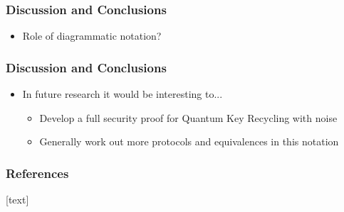 \documentclass[]{beamer}
\begin{document}
\begin{frame}
	\frametitle{Discussion and Conclusions}
	\begin{itemize}
	\item Role of diagrammatic notation?
	\end{itemize}
\end{frame}

\begin{frame}
	\frametitle{Discussion and Conclusions}
	\begin{itemize}
		\item In future research it would be interesting to...
		\begin{itemize}
			\item Develop a full security proof for Quantum Key Recycling with noise
			\item Generally work out more protocols and equivalences in this notation
		\end{itemize}
	\end{itemize}
\end{frame}

\begin{frame}
		\centering 
		\Huge
\end{frame}
\begin{frame}[shrink=1]
	\frametitle{References}
[text]
	
	
\end{frame}
\end{document}
